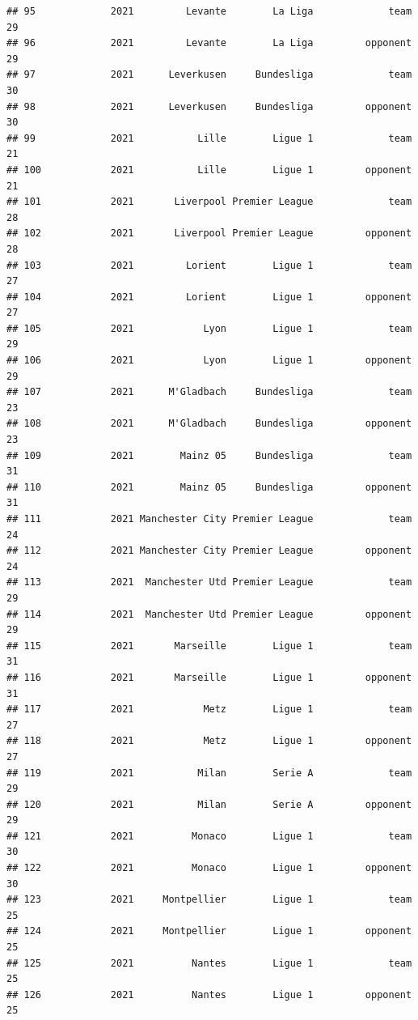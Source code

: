\documentclass[
]{book}
\theoremstyle{definition}
\theoremstyle{definition}
\theoremstyle{definition}
\theoremstyle{definition}
\theoremstyle{remark}
\begin{document}
\begin{verbatim}
## 95             2021         Levante        La Liga             team          29
## 96             2021         Levante        La Liga         opponent          29
## 97             2021      Leverkusen     Bundesliga             team          30
## 98             2021      Leverkusen     Bundesliga         opponent          30
## 99             2021           Lille        Ligue 1             team          21
## 100            2021           Lille        Ligue 1         opponent          21
## 101            2021       Liverpool Premier League             team          28
## 102            2021       Liverpool Premier League         opponent          28
## 103            2021         Lorient        Ligue 1             team          27
## 104            2021         Lorient        Ligue 1         opponent          27
## 105            2021            Lyon        Ligue 1             team          29
## 106            2021            Lyon        Ligue 1         opponent          29
## 107            2021      M'Gladbach     Bundesliga             team          23
## 108            2021      M'Gladbach     Bundesliga         opponent          23
## 109            2021        Mainz 05     Bundesliga             team          31
## 110            2021        Mainz 05     Bundesliga         opponent          31
## 111            2021 Manchester City Premier League             team          24
## 112            2021 Manchester City Premier League         opponent          24
## 113            2021  Manchester Utd Premier League             team          29
## 114            2021  Manchester Utd Premier League         opponent          29
## 115            2021       Marseille        Ligue 1             team          31
## 116            2021       Marseille        Ligue 1         opponent          31
## 117            2021            Metz        Ligue 1             team          27
## 118            2021            Metz        Ligue 1         opponent          27
## 119            2021           Milan        Serie A             team          29
## 120            2021           Milan        Serie A         opponent          29
## 121            2021          Monaco        Ligue 1             team          30
## 122            2021          Monaco        Ligue 1         opponent          30
## 123            2021     Montpellier        Ligue 1             team          25
## 124            2021     Montpellier        Ligue 1         opponent          25
## 125            2021          Nantes        Ligue 1             team          25
## 126            2021          Nantes        Ligue 1         opponent          25

\end{verbatim}
\end{document}
